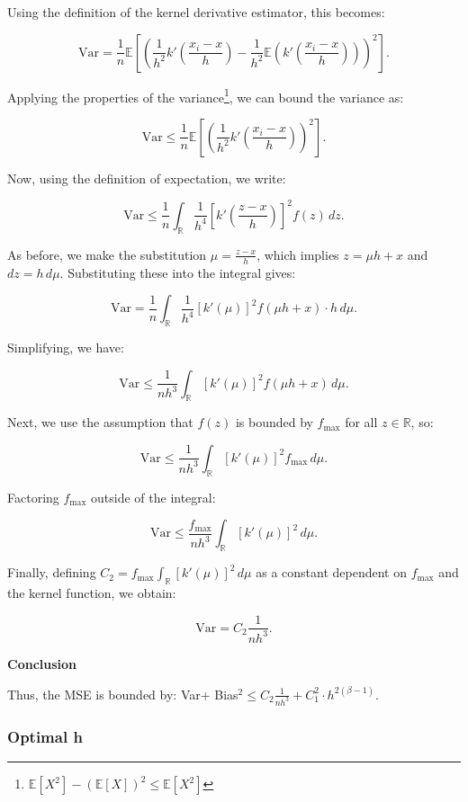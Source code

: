 \documentclass{article}
\begin{document}
Using the definition of the kernel derivative estimator, this becomes:

\[
\text{Var} = \frac{1}{n} \mathbb{E}\left[\left(\frac{1}{h^2} k'\left(\frac{x_i - x}{h}\right) - \frac{1}{h^2} \mathbb{E}\left(k'\left(\frac{x_i - x}{h}\right)\right)\right)^2\right].
\]

Applying the properties of the variance\footnote{\(\mathbb{E}[X^2] - (\mathbb{E}[X])^2 \leq \mathbb{E}[X^2]\)}, we can bound the variance as:

\[
\text{Var} \leq \frac{1}{n} \mathbb{E}\left[\left(\frac{1}{h^2} k'\left(\frac{x_i - x}{h}\right)\right)^2\right].
\]

Now, using the definition of expectation, we write:

\[
\text{Var} \leq \frac{1}{n} \int_{\mathbb{R}} \frac{1}{h^4} \left[k'\left(\frac{z - x}{h}\right)\right]^2 f(z) \, dz.
\]

As before, we make the substitution \(\mu = \frac{z - x}{h}\), which implies \(z = \mu h + x\) and \(dz = h \, d\mu\). Substituting these into the integral gives:

\[
\text{Var} = \frac{1}{n} \int_{\mathbb{R}} \frac{1}{h^4} \left[k'(\mu)\right]^2 f(\mu h + x) \cdot h \, d\mu.
\]

Simplifying, we have:

\[
\text{Var} \leq \frac{1}{n h^3} \int_{\mathbb{R}} \left[k'(\mu)\right]^2 f(\mu h + x) \, d\mu.
\]

Next, we use the assumption that \(f(z)\) is bounded by \(f_{\text{max}}\) for all \(z \in \mathbb{R}\), so:

\[
\text{Var} \leq \frac{1}{n h^3} \int_{\mathbb{R}} \left[k'(\mu)\right]^2 f_{\text{max}} \, d\mu.
\]

Factoring \(f_{\text{max}}\) outside of the integral:

\[
\text{Var} \leq \frac{f_{\text{max}}}{n h^3} \int_{\mathbb{R}} \left[k'(\mu)\right]^2 \, d\mu.
\]

Finally, defining \(C_2 = f_{\text{max}} \int_{\mathbb{R}} \left[k'(\mu)\right]^2 \, d\mu\) as a constant dependent on \(f_{\text{max}}\) and the kernel function, we obtain:

\[
\text{Var} = C_2 \frac{1}{n h^3}.
\]


\textbf{Conclusion}

Thus, the MSE is bounded by: Var+ Bias\(^{2}\leq C_{2}\frac{1}{nh^{3}} +C_1^{2} \cdot h^{2(\beta - 1)}\). \\ 

\subsubsection{Optimal h}
\end{document}
